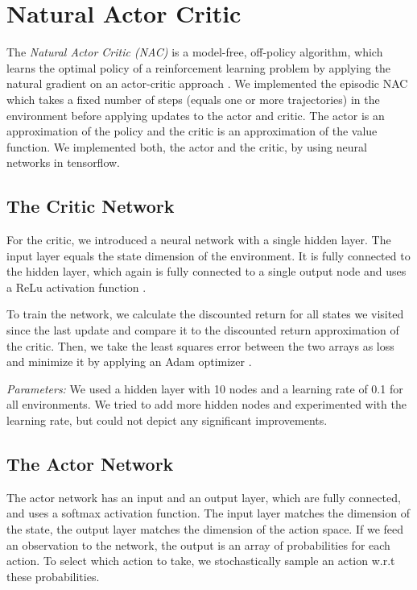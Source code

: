 
\section{Natural Actor Critic}
\label{sec:nac}

The \textit{Natural Actor Critic (NAC)} \citep{peters2008natural} is a model-free, off-policy algorithm, which learns the optimal policy of a reinforcement learning problem by applying the natural gradient \citep{amari1998natural} on an actor-critic approach \citep{sutton1998introduction}. We implemented the episodic NAC \citep{peters2008natural} which takes a fixed number of steps (equals one or more trajectories) in the environment before applying updates to the actor and critic. The actor is an approximation of the policy and the critic is an approximation of the value function. We implemented both, the actor and the critic, by using neural networks in tensorflow.

\subsection{The Critic Network}
For the critic, we introduced a neural network with a single hidden layer. The input layer equals the state dimension of the environment. It is fully connected to the hidden layer, which again is fully connected to a single output node and uses a ReLu activation function \citep{glorot2011deep}. 

To train the network, we calculate the discounted return for all states we visited since the last update and compare it to the discounted return approximation of the critic. Then, we take the least squares error between the two arrays as loss and minimize it by applying an Adam optimizer \citep{kingma2014adam}.

\textit{Parameters:} We used a hidden layer with 10 nodes and a learning rate of 0.1 for all environments. We tried to add more hidden nodes and experimented with the learning rate, but could not depict any significant improvements.

\subsection{The Actor Network}

The actor network has an input and an output layer, which are fully connected, and uses a softmax activation function. The input layer matches the dimension of the state, the output layer matches the dimension of the action space. If we feed an observation to the network, the output is an array of probabilities for each action. To select which action to take, we stochastically sample an action w.r.t these probabilities.

